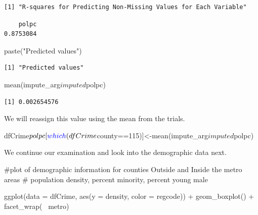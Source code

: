 \documentclass[]{article}
\newenvironment{Shaded}{}{}
\newcommand{\CommentTok}[1]{\textcolor[rgb]{0.00,0.50,0.00}{#1}}
\newcommand{\DataTypeTok}[1]{#1}
\newcommand{\DecValTok}[1]{#1}
\newcommand{\KeywordTok}[1]{\textcolor[rgb]{0.00,0.00,1.00}{#1}}
\newcommand{\NormalTok}[1]{#1}
\newcommand{\OperatorTok}[1]{#1}
\newcommand{\StringTok}[1]{\textcolor[rgb]{0.00,0.50,0.50}{#1}}
\begin{document}
\begin{verbatim}
[1] "R-squares for Predicting Non-Missing Values for Each Variable"
\end{verbatim}

\begin{Shaded}
\end{Shaded}

\begin{verbatim}
    polpc 
0.8753084 
\end{verbatim}

\begin{Shaded}
\begin{Highlighting}[]
\KeywordTok{paste}\NormalTok{(}\StringTok{"Predicted values"}\NormalTok{)}
\end{Highlighting}
\end{Shaded}

\begin{verbatim}
[1] "Predicted values"
\end{verbatim}

\begin{Shaded}
\begin{Highlighting}[]
\KeywordTok{mean}\NormalTok{(impute_arg}\OperatorTok{$}\NormalTok{imputed}\OperatorTok{$}\NormalTok{polpc)}
\end{Highlighting}
\end{Shaded}

\begin{verbatim}
[1] 0.002654576
\end{verbatim}

We will reassign this value using the mean from the trials.

\begin{Shaded}
\begin{Highlighting}[]
\NormalTok{dfCrime}\OperatorTok{$}\NormalTok{polpc[}\KeywordTok{which}\NormalTok{(dfCrime}\OperatorTok{$}\NormalTok{county}\OperatorTok{==}\DecValTok{115}\NormalTok{)]<-}\KeywordTok{mean}\NormalTok{(impute_arg}\OperatorTok{$}\NormalTok{imputed}\OperatorTok{$}\NormalTok{polpc)}
\end{Highlighting}
\end{Shaded}

We continue our examination and look into the demographic data next.

\begin{Shaded}
\begin{Highlighting}[]
\CommentTok{#plot of demographic information for counties Outside and Inside the metro areas}
\CommentTok{# population density, percent minority, percent young male}

\KeywordTok{ggplot}\NormalTok{(}\DataTypeTok{data =}\NormalTok{ dfCrime, }\KeywordTok{aes}\NormalTok{(}\DataTypeTok{y =}\NormalTok{ density, }\DataTypeTok{color =}\NormalTok{ regcode)) }\OperatorTok{+}
\StringTok{      }\KeywordTok{geom_boxplot}\NormalTok{() }\OperatorTok{+}\StringTok{ }\KeywordTok{facet_wrap}\NormalTok{(}\OperatorTok{~}\StringTok{ }\NormalTok{metro)}
\end{Highlighting}
\end{Shaded}
\end{document}
